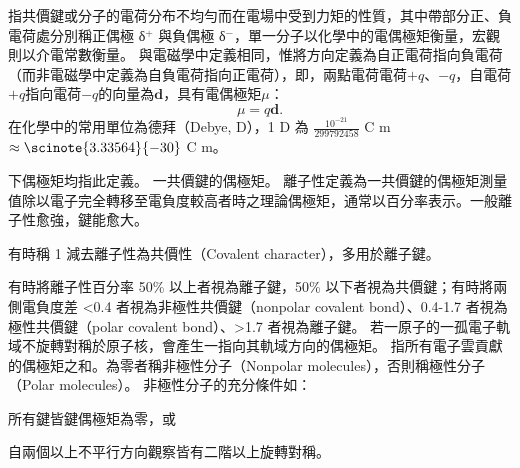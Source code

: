\documentclass[a4paper,12pt]{report}
\begin{document}
指共價鍵或分子的電荷分布不均勻而在電場中受到力矩的性質，其中帶部分正、負電荷處分別稱正偶極 δ$^+$ 與負偶極 δ$^-$，單一分子以化學中的電偶極矩衡量，宏觀則以介電常數衡量。
與電磁學中定義相同，惟將方向定義為自正電荷指向負電荷（而非電磁學中定義為自負電荷指向正電荷），即，兩點電荷電荷$+q$、$-q$，自電荷$+q$指向電荷$-q$的向量為$\mathbf{d}$，具有電偶極矩$\mu$：
\[\mu=q\mathbf{d}.\]
在化學中的常用單位為德拜（Debye, D），1 D 為 $\frac{10^{-21}}{299792458}$ C m $\approx\scinote{3.33564}{-30}$ C m。

下偶極矩均指此定義。
一共價鍵的偶極矩。
離子性定義為一共價鍵的偶極矩測量值除以電子完全轉移至電負度較高者時之理論偶極矩，通常以百分率表示。一般離子性愈強，鍵能愈大。

有時稱 1 減去離子性為共價性（Covalent character），多用於離子鍵。

有時將離子性百分率 50\% 以上者視為離子鍵，50\% 以下者視為共價鍵；有時將兩側電負度差 <0.4 者視為非極性共價鍵（nonpolar covalent bond）、0.4-1.7 者視為極性共價鍵（polar covalent bond）、>1.7 者視為離子鍵。
若一原子的一孤電子軌域不旋轉對稱於原子核，會產生一指向其軌域方向的偶極矩。
指所有電子雲貢獻的偶極矩之和。為零者稱非極性分子（Nonpolar molecules），否則稱極性分子（Polar molecules）。
非極性分子的充分條件如：
\bit
\item 所有鍵皆鍵偶極矩為零，或
\item 自兩個以上不平行方向觀察皆有二階以上旋轉對稱。
\eit
\end{document}
